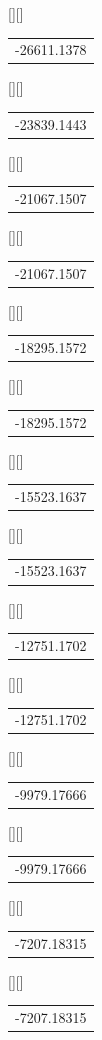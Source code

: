\begin{psfrags}
[][]{\color[rgb]{0,0,0}\setlength{\tabcolsep}{0pt}\begin{tabular}{c}-26611.1378\end{tabular}}%
[][]{\color[rgb]{0,0,0}\setlength{\tabcolsep}{0pt}\begin{tabular}{c}-23839.1443\end{tabular}}%
[][]{\color[rgb]{0,0,0}\setlength{\tabcolsep}{0pt}\begin{tabular}{c}-21067.1507\end{tabular}}%
[][]{\color[rgb]{0,0,0}\setlength{\tabcolsep}{0pt}\begin{tabular}{c}-21067.1507\end{tabular}}%
[][]{\color[rgb]{0,0,0}\setlength{\tabcolsep}{0pt}\begin{tabular}{c}-18295.1572\end{tabular}}%
[][]{\color[rgb]{0,0,0}\setlength{\tabcolsep}{0pt}\begin{tabular}{c}-18295.1572\end{tabular}}%
[][]{\color[rgb]{0,0,0}\setlength{\tabcolsep}{0pt}\begin{tabular}{c}-15523.1637\end{tabular}}%
[][]{\color[rgb]{0,0,0}\setlength{\tabcolsep}{0pt}\begin{tabular}{c}-15523.1637\end{tabular}}%
[][]{\color[rgb]{0,0,0}\setlength{\tabcolsep}{0pt}\begin{tabular}{c}-12751.1702\end{tabular}}%
[][]{\color[rgb]{0,0,0}\setlength{\tabcolsep}{0pt}\begin{tabular}{c}-12751.1702\end{tabular}}%
[][]{\color[rgb]{0,0,0}\setlength{\tabcolsep}{0pt}\begin{tabular}{c}-9979.17666\end{tabular}}%
[][]{\color[rgb]{0,0,0}\setlength{\tabcolsep}{0pt}\begin{tabular}{c}-9979.17666\end{tabular}}%
[][]{\color[rgb]{0,0,0}\setlength{\tabcolsep}{0pt}\begin{tabular}{c}-7207.18315\end{tabular}}%
[][]{\color[rgb]{0,0,0}\setlength{\tabcolsep}{0pt}\begin{tabular}{c}-7207.18315\end{tabular}}%

\end{psfrags}
